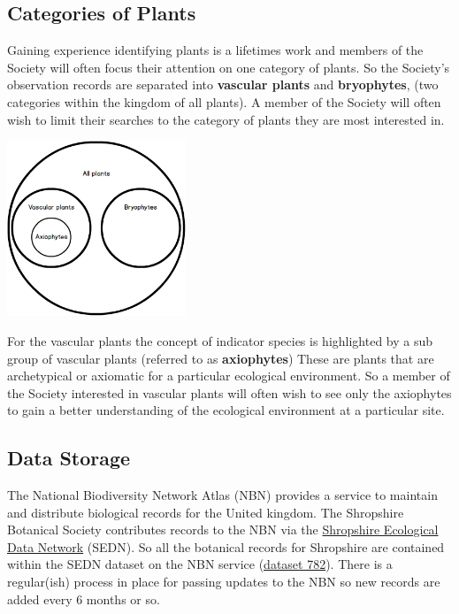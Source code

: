 \documentclass[a4paper,12pt,landscape]{article}
\begin{document}
\begin{multicols*}{2}
  \subsection{Categories of Plants}
  Gaining experience identifying plants is a lifetimes work
  and members of the Society will often
  focus their attention on one category of plants.
  So the Society's observation records
  are separated into \textbf{vascular plants} and \textbf{bryophytes},
  (two categories within the kingdom of all plants).
  A member of the Society will often wish to limit their searches to the
  category of plants they are most interested in.

  \includegraphics[width=0.4\textwidth,height=\textheight,keepaspectratio]{./wireframes/Categories.png}

  For the vascular plants
  the concept of indicator species is highlighted
  by a sub group of vascular plants
  (referred to as \textbf{axiophytes})
  These are plants that are archetypical or axiomatic for a particular ecological environment.
  So a member of the Society interested in vascular plants
  will often wish to see only the axiophytes
  to gain a better understanding of the ecological environment
  at a particular site.

  \subsection{Data Storage}
  The National Biodiversity Network Atlas (NBN)
  provides a service to maintain and distribute biological records
  for the United kingdom.
  The Shropshire Botanical Society contributes records to the NBN
  via the \href{https://sites.google.com/view/sedn/home}{Shropshire Ecological Data Network} (SEDN).
  So all the botanical records for Shropshire
  are contained within the SEDN dataset on the NBN service
  (\href{https://records.nbnatlas.org/occurrences/search?q=data_resource_uid%3Adr782}{dataset 782}).
  There is a regular(ish) process in place for passing updates to the NBN
  so new records are added every 6 months or so. 


\end{multicols*}
\end{document}
